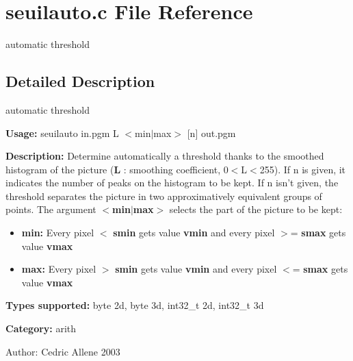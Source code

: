 \section{seuilauto.c File Reference}
\label{seuilauto_8c}
automatic threshold 



\subsection{Detailed Description}
automatic threshold 

{\bf Usage:} seuilauto in.pgm L $<$min$|$max$>$ [n] out.pgm

{\bf Description:} Determine automatically a threshold thanks to the smoothed histogram of the picture ({\bf L} : smoothing coefficient, 0$<$L$<$255). If n is given, it indicates the number of peaks on the histogram to be kept. If n isn't given, the threshold separates the picture in two approximatively equivalent groups of points. The argument {\bf $<$min$|$max$>$} selects the part of the picture to be kept:

\begin{itemize}
\item {\bf min:} Every pixel $<$ {\bf smin} gets value {\bf vmin} and every pixel $>$= {\bf smax} gets value {\bf vmax} \item {\bf max:} Every pixel $>$ {\bf smin} gets value {\bf vmin} and every pixel $<$= {\bf smax} gets value {\bf vmax} \end{itemize}
{\bf Types supported:} byte 2d, byte 3d, int32\_\-t 2d, int32\_\-t 3d

{\bf Category:} arith

\begin{Desc}
\item[Author:]Cedric Allene 2003 \end{Desc}
